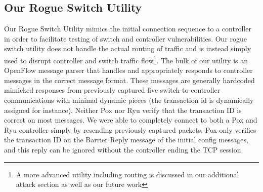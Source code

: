 \subsection{Our Rogue Switch Utility}
Our Rogue Switch Utility mimics the initial connection sequence to a controller in order to facilitate testing of switch and controller vulnerabilities. Our rogue switch utility does not handle the actual routing of traffic and is instead simply used to disrupt controller and switch traffic flow\footnote{A more advanced utility including routing is discussed in our additional attack section as well as our future work}. The bulk of our utility is an OpenFlow message parser that handles and appropriately responds to controller messages in the correct message format. These messages are generally hardcoded mimicked responses from previously captured live switch-to-controller communications with minimal dynamic pieces (the transaction id is dynamically assigned for instance).  Neither Pox nor Ryu verify that the transaction ID is correct on most messages. We were able to completely connect to both a Pox and Ryu controller simply by resending previously captured packets. Pox only verifies the transaction ID on the Barrier Reply message of the initial config messages, and this reply can be ignored without the controller ending the TCP session. 
